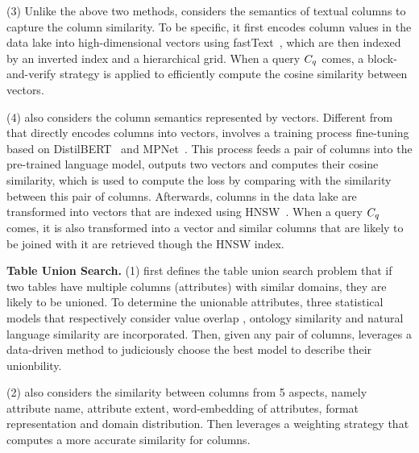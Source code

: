  


 \noindent  (3) Unlike the above two methods, \pex considers the semantics of textual columns to capture the column similarity. To be specific, it first encodes column values in the data lake into high-dimensional vectors using fastText~\cite{}, which are then indexed by an inverted index and a hierarchical grid. When a query $C_q$ comes, a block-and-verify strategy is applied to efficiently compute the cosine similarity between vectors. 
 
 
 \noindent  (4) \deepjoin also considers the column semantics represented by vectors. Different from \pex that directly encodes columns into vectors,  \deepjoin involves a training process fine-tuning based on DistilBERT~\cite{} and MPNet~\cite{}. This process feeds a pair of columns into the pre-trained language model,  outputs two vectors and computes their cosine similarity, which is used to compute the loss by comparing with the similarity between this pair of columns. Afterwards,  columns in the data lake are transformed into vectors that are indexed using HNSW~\cite{}. When a query $C_q$ comes, it is also transformed into a vector and similar columns that are likely to be joined with it are retrieved though the HNSW index. 
 


\noindent\textbf{Table Union Search.}
 (1) \tus first defines the table union search problem that  if two tables have multiple columns (\ie attributes) with similar domains, they are likely to be unioned. To determine the unionable attributes, three statistical models that respectively consider value overlap , ontology similarity and natural language similarity are incorporated. Then, given any pair of columns,  \tus leverages a data-driven  method to judiciously choose the best model to describe their unionbility. %

 \noindent  (2) \dlll also considers the similarity between columns from 5 aspects, namely attribute name, attribute extent, word-embedding of attributes, format representation and domain distribution. Then \dlll leverages a weighting strategy that computes a more accurate similarity for columns.  
  
